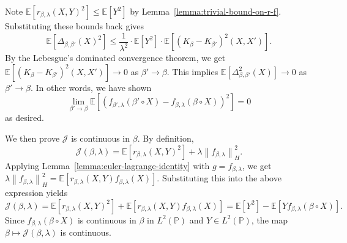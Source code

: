 \documentclass[sn-mathphys-num]{sn-jnl}%
\numberwithin{equation}{section}
\newcommand{\E}{\mathbb{E}}
\newcommand{\kernel}{K}
\newcommand{\norm}[1]{\left\|{#1}\right\|} %
\renewcommand{\P}{\mathbb{P}}
\theoremstyle{thmstyleone}%
\theoremstyle{thmstyletwo}%
\theoremstyle{thmstylethree}%
\begin{document}
Note $\E[r_{\beta, \lambda}(X, Y)^2]\le \E[Y^2]$ by Lemma~\ref{lemma:trivial-bound-on-r-f}. Substituting these bounds back gives
\begin{equation*}
\E[\Delta_{\beta, \beta'}(X)^2]
\le \frac{1}{\lambda^2} \cdot \E[Y^2] \cdot \E[(\kernel_\beta - \kernel_{\beta'})^2(X,X')] .
\end{equation*}
By the Lebesgue's dominated convergence theorem, we get $\E[(\kernel_\beta - \kernel_{\beta'})^2(X,X')] \to 0$ 
as $\beta' \to \beta$. This implies $\E[\Delta^2_{\beta, \beta'}(X)] \to 0$ as $\beta' \to \beta$. In other words, we have shown 
\begin{equation*}
	\lim_{\beta' \to \beta} \E[(f_{\beta', \lambda}( \beta' \circ X) - f_{\beta, \lambda} (\beta \circ X))^2] = 0
\end{equation*}
as desired. 

We then prove $\mathcal{J}$ is continuous in $\beta$.  By definition,
\begin{equation*}
	\mathcal{J}(\beta, \lambda) = \E[r_{\beta, \lambda}(X, Y)^2] + \lambda \norm{f_{\beta, \lambda}}_H^2.
\end{equation*}
Applying Lemma~\ref{lemma:euler-lagrange-identity} with $g = f_{\beta, \lambda}$, we get 
$\lambda \norm{f_{\beta, \lambda}}_H^2 = \E[r_{\beta, \lambda}(X, Y) f_{\beta, \lambda}(X)]$. Substituting this into the 
above expression yields
\begin{equation*}
	\mathcal{J}(\beta, \lambda) = \E[r_{\beta, \lambda}(X, Y)^2] + \E[r_{\beta, \lambda}(X, Y) f_{\beta, \lambda}(X)]
		= \E[Y^2] - \E[Y f_{\beta, \lambda}(\beta \circ X)].
\end{equation*}
Since $f_{\beta, \lambda}(\beta \circ X)$ is continuous in $\beta$ in $L^2(\P)$ and $Y \in L^2(\P)$, the map $\beta \mapsto \mathcal{J}(\beta, \lambda)$ is continuous.
\end{document}
